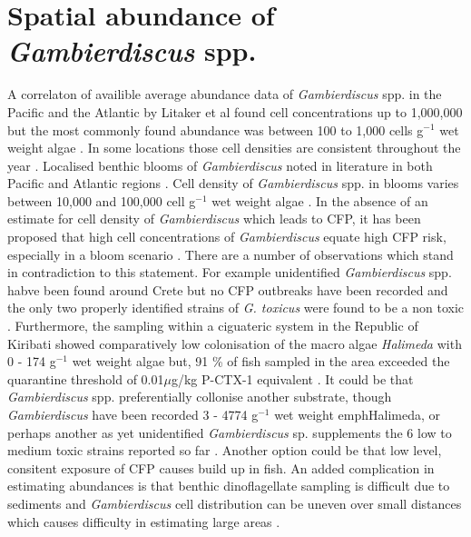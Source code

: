 \documentclass[12pt]{article}
\begin{document}
\section{Spatial abundance of \emph{Gambierdiscus} spp.}
A correlaton of availible average abundance data of \emph{Gambierdiscus} spp. in the Pacific and the Atlantic by Litaker et al found cell concentrations up to 1,000,000 but the most commonly found abundance was between 100 to 1,000 cells g$^{-1}$ wet weight algae \cite{litaker2010global}. In some locations those cell densities are consistent throughout the year \cite{chinain1999seasonal}.
Localised benthic blooms of \emph{Gambierdiscus} noted in literature in both Pacific and Atlantic regions \cite{nakajima1981toxicity,withers1984ciguatera,chinain1999seasonal,darius2007ciguatera}.
Cell density of \emph{Gambierdiscus} spp. in blooms varies between 10,000 and 100,000 cell g$^{-1}$ wet weight algae \cite{chinain1999seasonal}. In the absence of an estimate for cell density of \emph{Gambierdiscus} which leads to CFP, it has been proposed  that high cell concentrations of \emph{Gambierdiscus} equate high CFP risk, especially in a bloom scenario \cite{litaker2010global}. 
There are a number of observations which stand in contradiction to this statement. For example unidentified \emph{Gambierdiscus} spp. habve been found around Crete but no CFP outbreaks have been recorded and the only two properly identified strains of \emph{G. toxicus} were found to be a non toxic \cite{caillaud2010update,chinain2010growth}.
Furthermore, the sampling within a ciguateric system in the Republic of Kiribati showed comparatively low colonisation of the macro algae \emph{Halimeda} with 0 - 174 g$^{-1}$ wet weight algae but, 91 \% of fish sampled in the area exceeded the quarantine threshold of 0.01$\mu$g/kg P-CTX-1 equivalent \cite{xu2014distribution,chan2011spatial}. It could be that \emph{Gambierdiscus} spp. preferentially collonise another substrate, though \emph{Gambierdiscus} have been recorded 3 - 4774 g$^{-1}$ wet weight emph{Halimeda}, or perhaps another as yet unidentified \emph{Gambierdiscus} sp. supplements the 6 low to medium toxic strains reported so far  \cite{xu2014distribution, bomber1988r}. Another option could be that low level, consitent exposure of CFP causes build up in fish.
An added complication in estimating abundances is that benthic dinoflagellate sampling is difficult due to sediments and \emph{Gambierdiscus} cell distribution can be uneven over small distances which causes difficulty in estimating large areas \cite{lobel1988assessment,ballantine1988population,litaker2010global}.
\end{document}
